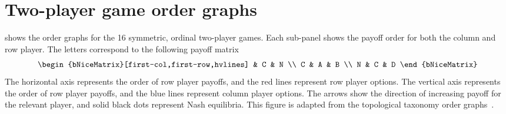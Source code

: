 \section{Two-player game order graphs}\label{sec:order_graphs}
\begin{center}
    
    \label{fig:order_graphs}
\end{center}

 shows the
order graphs for the 16 symmetric, ordinal two-player games.
Each sub-panel shows the payoff order for both the column
and row player.
The letters correspond to the following payoff matrix
\begin{equation*}
  \begin{bNiceMatrix}[first-col,first-row,hvlines]
    & C & N \\
    C & A & B \\
    N & C & D
  \end{bNiceMatrix}
\end{equation*}
The horizontal axis represents the order of row player payoffs,
and the red lines represent row player options.
The vertical axis represents the order of row player payoffs,
and the blue lines represent column player options.
The arrows show the direction of increasing
payoff for the relevant player,
and solid black dots represent Nash equilibria.
This figure is adapted from the topological taxonomy
order graphs~\citep{bruns2015names}.

